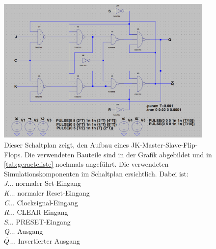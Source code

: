 \documentclass[12pt,english,ngerman]{scrartcl}
\begin{document}
\begin{figure}[H]
  \centering
  \includegraphics[width=0.95\textwidth]{./figures/sim/jk/aufbaujk.png}
    \caption{Dieser Schaltplan zeigt, den Aufbau eines
      JK-Master-Slave-Flip-Flops. Die verwendeten Bauteile sind in der Grafik
      abgebildet und in \autoref{tab:geraeteliste} nochmals angeführt. Die
      verwendeten Simulationskomponenten im Schaltplan
      ersichtlich.
    Dabei ist:\\
    \textit{J}$\dots$ normaler Set-Eingang\\
    \textit{K}$\dots$ normaler Reset-Eingang\\
    \textit{C}$\dots$ Clocksignal-Eingang\\
    \textit{R}$\dots$ CLEAR-Eingang\\
    \textit{S}$\dots$ PRESET-Eingang\\
    \textit{Q}$\dots$ Ausgang\\
    \textit{$\Bar{Q}$}$\dots$ Invertierter Ausgang\\
  }
  \label{fig:sim_aufbau_jk}
\end{figure}
\end{document}
